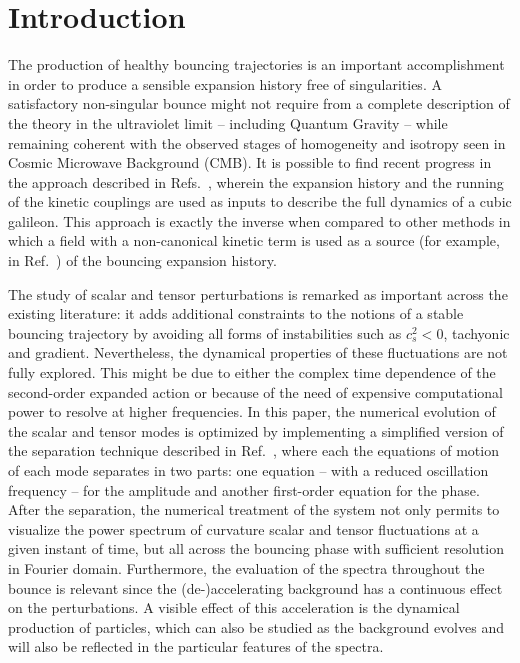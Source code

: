 \documentclass[aps,prd,reprint,twocolumn,showpacs,nofootinbib,superscriptaddress,floatfix]{revtex4-1}
\begin{document}
\section{Introduction}
The production of healthy bouncing trajectories is an important accomplishment in order to produce a sensible expansion history free of singularities. A satisfactory non-singular bounce might not require from a complete description of the theory in the ultraviolet limit -- including Quantum Gravity -- while remaining coherent with the observed stages of homogeneity and isotropy seen in Cosmic Microwave Background (CMB). It is possible to find recent progress in the approach described in Refs.~\cite{Ijjas:2016tpn, Ijjas:2016vtq}, wherein the expansion history and the running of the kinetic couplings are used as inputs to describe the full dynamics of a cubic galileon. This approach is exactly the inverse when compared to other methods in which a field with a non-canonical kinetic term is used as a source (for example, in Ref.~\cite{Deffayet:2010qz, Easson:2011zy}) of the bouncing expansion history.  

The study of scalar and tensor perturbations is remarked as important across the existing literature: it adds additional constraints to the notions of a stable bouncing trajectory by avoiding all forms of instabilities such as $c_s^2<0$, tachyonic and gradient. Nevertheless, the dynamical properties of these fluctuations are not fully explored. This might be due to either the complex time dependence of the second-order expanded action or because of the need of expensive computational power to resolve at higher frequencies. In this paper, the numerical evolution of the scalar and tensor modes is optimized by implementing a simplified version of the separation technique described in Ref.~\cite{Ghersi:2016gee}, where each the equations of motion of each mode separates in two parts: one equation -- with a reduced oscillation frequency -- for the amplitude and another first-order equation for the phase. After the separation, the numerical treatment of the system not only permits to visualize the power spectrum of curvature scalar and tensor fluctuations at a given instant of time, but all across the bouncing phase with sufficient resolution in Fourier domain. Furthermore, the evaluation of the spectra throughout the bounce is relevant since the (de-)accelerating background has a continuous effect on the perturbations. A visible effect of this acceleration is the dynamical production of particles, which can also be studied as the background evolves and will also be reflected in the particular features of the spectra.              
\end{document}
